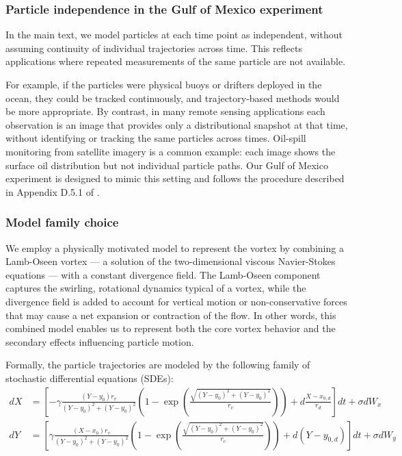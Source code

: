 \subsubsection{Particle independence in the Gulf of Mexico experiment}
\label{app:gom_assumptions}
In the main text, we model particles at each time point as independent, without assuming continuity of individual trajectories across time. This reflects applications where repeated measurements of the same particle are not available. 

For example, if the particles were physical buoys or drifters deployed in the ocean, they could be tracked continuously, and trajectory-based methods would be more appropriate. By contrast, in many remote sensing applications each observation is an image that provides only a distributional snapshot at that time, without identifying or tracking the same particles across times. Oil-spill monitoring from satellite imagery is a common example: each image shows the surface oil distribution but not individual particle paths. Our Gulf of Mexico experiment is designed to mimic this setting and follows the procedure described in Appendix D.5.1 of \citet{shen2024multi}.


\subsubsection{Model family choice}
\label{app:gom_implementation}

We employ a physically motivated model to represent the vortex by combining a Lamb-Oseen vortex --- a solution of the two-dimensional viscous Navier-Stokes equations \citep{saffman1995vortex} --- with a constant divergence field. The Lamb-Oseen component captures the swirling, rotational dynamics typical of a vortex, while the divergence field is added to account for vertical motion or non-conservative forces that may cause a net expansion or contraction of the flow. In other words, this combined model enables us to represent both the core vortex behavior and the secondary effects influencing particle motion.

Formally, the particle trajectories are modeled by the following family of stochastic differential equations (SDEs):
\begin{equation}
    \begin{aligned}
        dX&=\left[-\gamma\frac{(Y-y_0)r_v}{(Y-y_0)^2+(Y-y_0)^2}\left(1-\exp\left(\frac{\sqrt{(Y-y_0)^2+(Y-y_0)^2}}{r_v}\right)\right)+d\frac{X-x_{0,d}}{r_d}  \right]dt+\sigma dW_x\\
        dY&=\left[\gamma\frac{(X-x_0)r_v}{(Y-y_0)^2+(Y-y_0)^2}\left(1-\exp\left(\frac{\sqrt{(Y-y_0)^2+(Y-y_0)^2}}{r_v}\right)\right)+d(Y-y_{0,d})  \right]dt+\sigma dW_y\\
    \end{aligned}
\end{equation}

